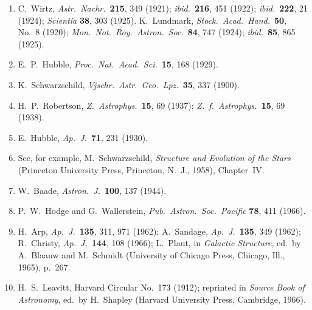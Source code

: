 \begin{enumerate}
  \item{}\label{ch14-ref-12}
  C.~Wirtz, \emph{Astr.\ Nachr.}\ \textbf{215}, 349 (1921);
  \emph{ibid.}\ \textbf{216}, 451 (1922);
  \emph{ibid.}\ \textbf{222}, 21 (1924);
  \emph{Scientia} \textbf{38}, 303 (1925).
  K.~Lundmark, \emph{Stock.\ Acad.\ Hand.}\ \textbf{50}, No.~8 (1920);
  \emph{Mon.\ Not.\ Roy.\ Astron.\ Soc.}\ \textbf{84}, 747 (1924);
  \emph{ibid.}\ \textbf{85}, 865 (1925).

  \item{}\label{ch14-ref-13}
  E.~P.~Hubble, \emph{Proc.\ Nat.\ Acad.\ Sci.}\ \textbf{15}, 168 (1929).

  \item{}\label{ch14-ref-14}
  K.~Schwarzschild, \emph{Vjschr.\ Astr.\ Geo.\ Lpz.}\ \textbf{35}, 337
  (1900).

  \item{}\label{ch14-ref-15}
  H.~P.~Robertson, \emph{Z.\ Astrophys.}\ \textbf{15}, 69 (1937);
  \emph{Z.\ f.\ Astrophys.}\ \textbf{15}, 69 (1938).

  \item{}\label{ch14-ref-16}
  E.~Hubble, \emph{Ap.\ J.}\ \textbf{71}, 231 (1930).

  \item{}\label{ch14-ref-17}
  See, for example, M.~Schwarzschild,
  \emph{Structure and Evolution of the Stars}
  (Princeton University Press, Princeton, N.~J., 1958), Chapter~IV.

  \item{}\label{ch14-ref-18}
  W.~Baade, \emph{Astron.\ J.}\ \textbf{100}, 137 (1944).

  \item{}\label{ch14-ref-19}
  P.~W.~Hodge and G.~Wallerstein,
  \emph{Pub.\ Astron.\ Soc.\ Pacific} \textbf{78}, 411 (1966).

  \item{}\label{ch14-ref-20}
  H.~Arp, \emph{Ap.\ J.}\ \textbf{135}, 311, 971 (1962);
  A.~Sandage, \emph{Ap.\ J.}\ \textbf{135}, 349 (1962);
  R.~Christy, \emph{Ap.\ J.}\ \textbf{144}, 108 (1966);
  L.~Plaut, in \emph{Galactic Structure}, ed.\ by A.~Blaauw and
  M.~Schmidt (University of Chicago Press, Chicago, Ill., 1965), p.~267.

  \item{}\label{ch14-ref-21}
  H.~S.~Leavitt, Harvard Circular No.~173 (1912); reprinted in
  \emph{Source Book of Astronomy}, ed.\ by H.~Shapley
  (Harvard University Press, Cambridge, 1966).


\end{enumerate}
